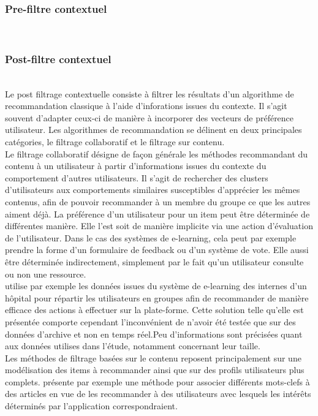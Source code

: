\documentclass[conference]{./sty/IEEEtran}
\begin{document}
\subsubsection{Pre-filtre contextuel}
~\\

\subsubsection{Post-filtre contextuel}
~\\
Le post filtrage contextuelle consiste à filtrer les résultats d'un algorithme
de recommandation classique à l'aide d'inforations issues du
contexte\cite{DBLP:journals/tlt/VerbertMOWDBD12}. Il s'agit souvent d'adapter
ceux-ci de manière à incorporer des vecteurs de préférence utilisateur. Les
algorithmes de recommandation se délinent en deux principales catégories, le
filtrage collaboratif et le filtrage sur contenu. \\

Le filtrage collaboratif désigne de façon générale les méthodes recommandant du
contenu à un utilisateur à partir d'informations issues du contexte du
comportement d'autres utilisateurs. Il s'agit de rechercher des clusters
d'utilisateurs aux comportements similaires susceptibles d'apprécier les mêmes
contenus, afin de pouvoir recommander à un membre du groupe ce que les autres
aiment déjà. La préférence d'un utilisateur pour un item peut être déterminée
de différentes manière. Elle l'est soit de manière implicite via une action
d'évaluation de l'utilisateur. Dans le cas des systèmes de e-learning, cela
peut par exemple prendre la forme d'un formulaire de feedback ou d'un système
de vote. Elle aussi être déterminée indirectement, simplement par le fait qu'un
utilisateur consulte ou non une ressource. \\
\cite{Liou:2014:CPL:2617848.2617854} utilise par exemple les données issues du
système de  e-learning des internes d'un hôpital pour répartir les utilisateurs
en groupes afin de recommander de manière efficace des actions à effectuer sur
la plate-forme. Cette solution telle qu'elle est présentée comporte cependant
l'inconvénient de n'avoir été testée que sur des données d'archive et non en
temps réel.Peu d'informations sont précisées quant aux données utilises dans
l'étude, notamment concernant leur taille.  \\

Les méthodes de filtrage basées sur le contenu reposent principalement sur
une modélisation des items à recommander ainsi que sur des profils utilisateurs
plus complets. \cite{DBLP:journals/jucs/SternKHKL10} présente par exemple une
méthode pour associer différents mots-clefs à des articles en vue de les
recommander à des utilisateurs avec lesquels les intérêts déterminés par
l'application correspondraient. \\
\end{document}
